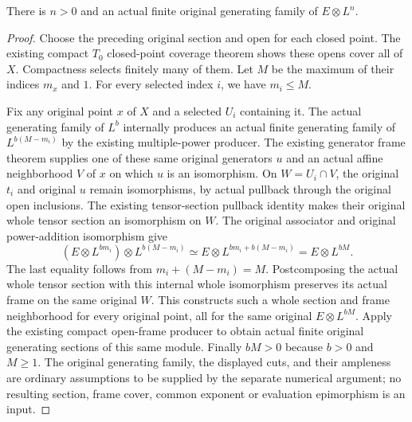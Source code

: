 \begin{theorem}
\label{thm:fixed-coefficient-positive-common-power-generators}
\leanok
There is $n>0$ and an actual finite original generating family of
$E\otimes L^n$.
\end{theorem}
\begin{proof}
Choose the preceding original section and open for each closed point.
The existing compact $T_0$ closed-point coverage theorem shows these
opens cover all of $X$. Compactness selects finitely many of them.
Let $M$ be the maximum of their indices $m_x$ and $1$.
For every selected index $i$, we have $m_i\le M$.

Fix any original point $x$ of $X$ and a selected $U_i$ containing it.
The actual generating family of $L^b$ internally produces an actual
finite generating family of $L^{b(M-m_i)}$ by the existing multiple-power
producer. The existing generator frame theorem supplies one of these
same original generators $u$ and an actual affine neighborhood $V$ of
$x$ on which $u$ is an isomorphism. On $W=U_i\cap V$, the original
$t_i$ and original $u$ remain isomorphisms, by actual pullback through
the original open inclusions. The existing tensor-section pullback
identity makes their original whole tensor section an isomorphism on $W$.
The original associator and original power-addition isomorphism give
\[
 (E\otimes L^{b m_i})\otimes L^{b(M-m_i)}
 \simeq E\otimes L^{b m_i+b(M-m_i)}
 =E\otimes L^{b M}.
\]
The last equality follows from $m_i+(M-m_i)=M$.
Postcomposing the actual whole tensor section with this internal whole
isomorphism preserves its actual frame on the same original $W$.
This constructs such a whole section and frame neighborhood for every
original point, all for the same original $E\otimes L^{bM}$.
Apply the existing compact open-frame producer to obtain actual finite
original generating sections of this same module. Finally $bM>0$
because $b>0$ and $M\ge1$. The original generating family, the displayed
cuts, and their ampleness are ordinary assumptions to be supplied by
the separate numerical argument; no resulting section, frame cover,
common exponent or evaluation epimorphism is an input.
\end{proof}
